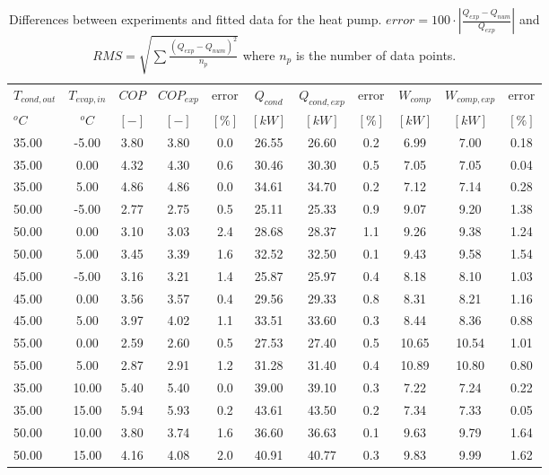 \documentclass[english]{SPFShortReport}
\begin{document}
\begin{table}[!ht]
\begin{small}
\caption{Differences between experiments and fitted data for the heat pump.          $error=100 \cdot |\frac{Q_{exp}-Q_{num}}{Q_{exp}}|$ and $RMS = \sqrt { \sum{\frac{(Q_{exp}-Q_{num})^2}{n_p}} }$ where $n_p$ is the number of data points.}
\begin{center}
\resizebox{12cm}{!} 
{
\begin{tabular}{l | c c c c c c c c c c } 
\hline
\hline
$T_{cond,out}$ &$T_{evap,in}$ &$COP$ &$COP_{exp}$ &error &$Q_{cond}$ &$Q_{cond,exp}$ &error &$W_{comp}$ &$W_{comp,exp}$ &error \\ 
$^oC$ &$^oC$ &$[-]$ &$[-]$ &$[\%]$ &$[kW]$ &$[kW]$ &$[\%]$ &$[kW]$ &$[kW]$ &$[\%]$\\ 
\hline
35.00  & -5.00 & 3.80 & 3.80 & 0.0 & 26.55 & 26.60 & 0.2 & 6.99 & 7.00 & 0.18\\ 
35.00  & 0.00 & 4.32 & 4.30 & 0.6 & 30.46 & 30.30 & 0.5 & 7.05 & 7.05 & 0.04\\ 
35.00  & 5.00 & 4.86 & 4.86 & 0.0 & 34.61 & 34.70 & 0.2 & 7.12 & 7.14 & 0.28\\ 
50.00  & -5.00 & 2.77 & 2.75 & 0.5 & 25.11 & 25.33 & 0.9 & 9.07 & 9.20 & 1.38\\ 
50.00  & 0.00 & 3.10 & 3.03 & 2.4 & 28.68 & 28.37 & 1.1 & 9.26 & 9.38 & 1.24\\ 
50.00  & 5.00 & 3.45 & 3.39 & 1.6 & 32.52 & 32.50 & 0.1 & 9.43 & 9.58 & 1.54\\ 
45.00  & -5.00 & 3.16 & 3.21 & 1.4 & 25.87 & 25.97 & 0.4 & 8.18 & 8.10 & 1.03\\ 
45.00  & 0.00 & 3.56 & 3.57 & 0.4 & 29.56 & 29.33 & 0.8 & 8.31 & 8.21 & 1.16\\ 
45.00  & 5.00 & 3.97 & 4.02 & 1.1 & 33.51 & 33.60 & 0.3 & 8.44 & 8.36 & 0.88\\ 
55.00  & 0.00 & 2.59 & 2.60 & 0.5 & 27.53 & 27.40 & 0.5 & 10.65 & 10.54 & 1.01\\ 
55.00  & 5.00 & 2.87 & 2.91 & 1.2 & 31.28 & 31.40 & 0.4 & 10.89 & 10.80 & 0.80\\ 
35.00  & 10.00 & 5.40 & 5.40 & 0.0 & 39.00 & 39.10 & 0.3 & 7.22 & 7.24 & 0.22\\ 
35.00  & 15.00 & 5.94 & 5.93 & 0.2 & 43.61 & 43.50 & 0.2 & 7.34 & 7.33 & 0.05\\ 
50.00  & 10.00 & 3.80 & 3.74 & 1.6 & 36.60 & 36.63 & 0.1 & 9.63 & 9.79 & 1.64\\ 
50.00  & 15.00 & 4.16 & 4.08 & 2.0 & 40.91 & 40.77 & 0.3 & 9.83 & 9.99 & 1.62\\ 

\end{tabular}}
\end{center}
\end{small}
\end{table}
\end{document}
